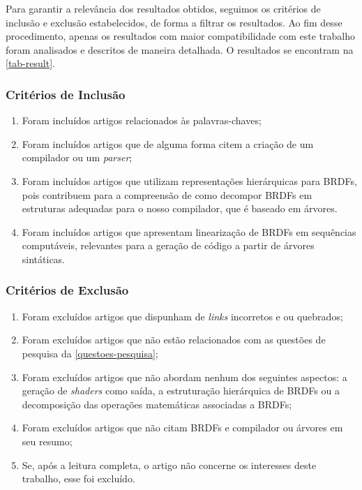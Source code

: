 Para garantir a relevância dos resultados obtidos, seguimos os critérios de inclusão e exclusão estabelecidos, de forma a filtrar os resultados. Ao fim desse procedimento, apenas os resultados com maior compatibilidade com este trabalho foram analisados e descritos de maneira detalhada. O resultados se encontram na \autoref{tab-result}.


\subsubsection{Critérios de Inclusão}


\begin{enumerate}
  \item Foram incluídos artigos relacionados às palavras-chaves;

  \item Foram incluídos artigos que de alguma forma citem a criação de um compilador ou um \textit{parser};

  \item Foram incluídos artigos que utilizam representações hierárquicas para BRDFs, pois contribuem para a compreensão de como decompor BRDFs em estruturas adequadas para o nosso compilador, que é baseado em árvores.

  \item Foram incluídos artigos que apresentam linearização de BRDFs em sequências computáveis, relevantes para a geração de código a partir de árvores sintáticas.
\end{enumerate}


\subsubsection{Critérios de Exclusão}


\begin{enumerate}
  \item Foram excluídos artigos que dispunham de \textit{links} incorretos e ou quebrados;
  \item Foram excluídos artigos que não estão relacionados com as questões de pesquisa da \autoref{questoes-pesquisa};
  \item Foram excluídos artigos que não abordam nenhum dos seguintes aspectos: a geração de \textit{shaders} como saída, a estruturação hierárquica de BRDFs ou a decomposição das operações matemáticas associadas a BRDFs;

  \item Foram excluídos artigos que não citam BRDFs e compilador ou árvores em seu resumo;
  \item Se, após a leitura completa, o artigo não concerne os interesses deste trabalho, esse foi excluído.
\end{enumerate}




